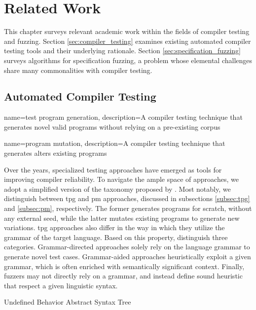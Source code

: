 \chapter{\label{cha:related}Related Work}

This chapter surveys relevant academic work within
the fields of compiler testing and fuzzing.
Section \ref{sec:compiler_testing} examines existing
automated compiler testing tools and their underlying rationale.
Section \ref{sec:specification_fuzzing} surveys algorithms
for specification fuzzing, a problem whose elemental challenges
share many commonalities with compiler testing. 

\section{\label{sec:compiler_testing}Automated Compiler Testing}

{
        name=test program generation,
        description={A compiler testing technique
        that generates novel valid programs
        without relying on a pre-existing corpus}
}

{
        name=program mutation,
        description={A compiler testing technique
        that generates alters existing programs}
}

Over the years, specialized testing approaches have emerged
as tools for improving compiler reliability.
To navigate the ample space of approaches, we adopt a simplified
version of the taxonomy proposed by \citet{chen2020survey}. 
Most notably, we distinguish between \gls{tpg} and \gls{pm} approaches, discussed
in subsections \ref{subsec:tpg} and \ref{subsec:pm}, respectively.
The former generates programs for scratch, without any
external seed, while the latter mutates existing programs to generate
new variations. 
\Gls{tpg} approaches also differ in the way in which they
utilize the grammar of the target language.
Based on this property, \citet{chen2020survey} distinguish three
categories.
Grammar-directed approaches solely rely on the
language grammar to generate novel test cases.
Grammar-aided approaches heuristically exploit a given
grammar, which is often enriched with semantically
significant context. 
Finally, fuzzers may not directly rely on a grammar,
and instead define sound heuristic that respect
a given linguistic syntax.


 {Undefined Behavior}
 {Abstract Syntax Tree}

